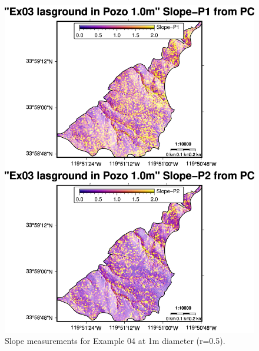 \documentclass[a4paperpaper,,tablecaptionabove]{scrartcl}
\begin{document}
\begin{figure}
\centering
\includegraphics[width=\textwidth,height=0.9\textheight]{./tex2pdf.-e6884bf2dada0f3b/616bc5d57bc644797e6b07e933a12283c9c2338c.png}
\caption{Slope measurements for Example 04 at 1m diameter
(r=0.5).\label{Fig:Ex04_cl2_1.0m_2panel_SLPs}}
\end{figure}
\end{document}
